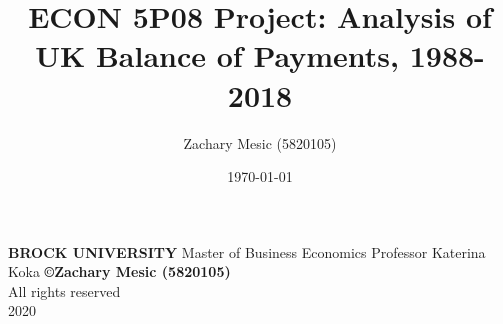 \documentclass[12pt]{article}
\begin{document}
\title{\textbf{ECON 5P08 Project: Analysis of UK Balance of Payments, 1988-2018}}
\author{Zachary Mesic (5820105)}
\date{\today}
\maketitle

\thispagestyle{empty}
\vfill
\begin{center}
\textbf{BROCK UNIVERSITY}
\break
Master of Business  Economics
\break
Professor Katerina Koka
\linebreak
\linebreak
\textbf{\copyright{Zachary Mesic (5820105)}}\\
All rights reserved\\

2020
\end{center}

\newpage
\end{document}
